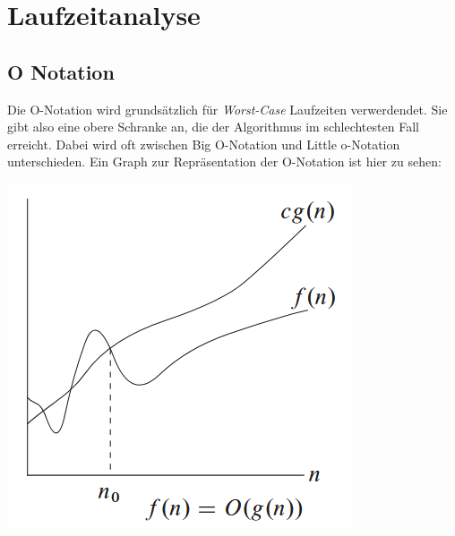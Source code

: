\documentclass[
../../AuD-Zusammenfassung.tex,
]
{subfiles}
\begin{document}
\section{Laufzeitanalyse}
\subsection{O Notation}
Die O-Notation wird grundsätzlich für \textit{Worst-Case} Laufzeiten verwerdendet. Sie gibt also eine obere Schranke an, die der Algorithmus im schlechtesten Fall erreicht. Dabei wird oft zwischen Big O-Notation und Little o-Notation unterschieden. 
Ein Graph zur Repräsentation der O-Notation ist hier zu sehen:
\begin{center}
    \includegraphics[scale=0.6]{Pics/ONotation.png}
\end{center}
\end{document}
